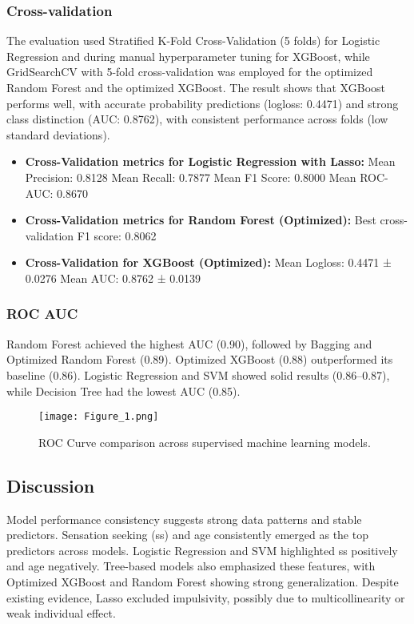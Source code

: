 \documentclass{article}
\begin{document}
\subsubsection*{Cross-validation}

The evaluation used Stratified K-Fold Cross-Validation (5 folds) for Logistic Regression and during manual hyperparameter tuning for XGBoost, while GridSearchCV with 5-fold cross-validation was employed for the optimized Random Forest and the optimized XGBoost. The result shows that XGBoost performs well, with accurate probability predictions (logloss: 0.4471) and strong class distinction (AUC: 0.8762), with consistent performance across folds (low standard deviations).

\begin{itemize}
    \item \textbf{Cross-Validation metrics for Logistic Regression with Lasso:}
Mean Precision: 0.8128
Mean Recall: 0.7877
Mean F1 Score: 0.8000
Mean ROC-AUC: 0.8670

\item \textbf{Cross-Validation metrics for Random Forest (Optimized):}
Best cross-validation F1 score: 0.8062

\item \textbf{Cross-Validation for XGBoost (Optimized):}
Mean Logloss: 0.4471 ± 0.0276
Mean AUC: 0.8762 ± 0.0139
\end{itemize}


\subsubsection*{ROC AUC}

Random Forest achieved the highest AUC (0.90), followed by Bagging and Optimized Random Forest (0.89). Optimized XGBoost (0.88) outperformed its baseline (0.86). Logistic Regression and SVM showed solid results (0.86–0.87), while Decision Tree had the lowest AUC (0.85).

\begin{figure}[h!]
    \centering
    \texttt{[image: Figure\_1.png]}
    \caption{ROC Curve comparison across supervised machine learning models.}
    \label{fig:ROC}
\end{figure}

\subsection*{Discussion}

Model performance consistency suggests strong data patterns and stable predictors. Sensation seeking (ss) and age consistently emerged as the top predictors across models. Logistic Regression and SVM highlighted ss positively and age negatively. Tree-based models also emphasized these features, with Optimized XGBoost and Random Forest showing strong generalization. Despite existing evidence, Lasso excluded impulsivity, possibly due to multicollinearity or weak individual effect.
\end{document}
